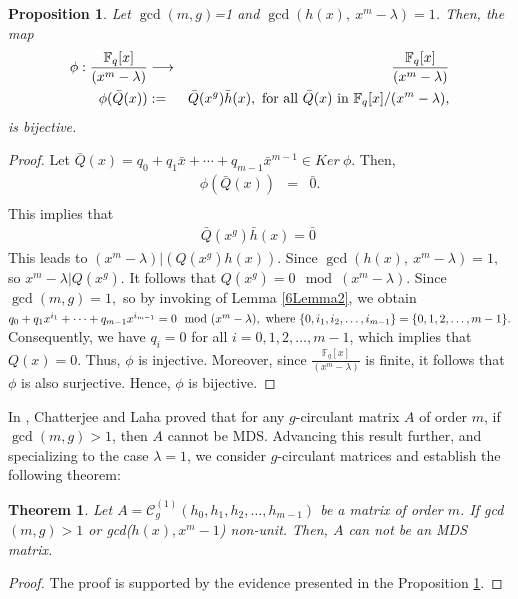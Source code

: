 \documentclass[12pt]{article}
\newtheorem{theorem}{Theorem}
\newtheorem{proposition}{Proposition}
\begin{document}
\begin{proposition}\label{6Proposition2}
	Let $\gcd(m,g)$=1 and $\gcd(h(x),~x^m-\lambda)=1$. Then, the map 
	\begin{eqnarray*}
	\phi:\frac{\mathbb{F}_q[x]}{(x^m-\lambda)} &\longrightarrow& \frac{\mathbb{F}_q[x]}{(x^m-\lambda)}\\		\phi(\bar{Q}(x))&:=&\bar{Q}(x^g)\bar{h}(x),\textup{ for all $\bar{Q}(x)$ in \( \mathbb{F}_q[x]/(x^m - \lambda) \),}
\end{eqnarray*}
	is bijective. 
\end{proposition}
\begin{proof}
	Let $\bar{Q}(x)=q_0+q_1\bar{x}+\cdots+q_{m-1}\bar{x}^{m-1}\in Ker~\phi$. Then, 
	\begin{eqnarray*}
		\phi(\bar{Q}(x))&=&\bar{0}.\\
	\end{eqnarray*}
	This implies that
	\begin{eqnarray*}	
			\bar{Q}(x^g)\bar{h}(x)=\bar{0}~
	\end{eqnarray*}
	This leads to $(x^m-\lambda)|(Q(x^g)h(x)).$ Since $\gcd(h(x),~x^m-\lambda)=1,$ so $x^m-\lambda |Q(x^g).$ It follows that $Q(x^g)=0 \mod(x^m-\lambda)$. Since $\gcd(m,g)=1,$ so by invoking of Lemma \ref{6Lemma2}, we obtain
	$q_0+q_1x^{i_1}+\cdots+q_{m-1}x^{i_{m-1}}=0 \mod (x^m-\lambda), \textup{ where}~\{0,i_1,i_2,\dots,i_{m-1}\}=\{0,1,2,\dots,m-1\}.$
Consequently, we have \( q_i = 0 \) for all \( i = 0,1,2,\dots,m-1 \), which implies that \( Q(x) = 0 \). Thus, \( \phi \) is injective. Moreover, since \( \frac{\mathbb{F}_q[x]}{(x^m-\lambda)} \) is finite, it follows that \( \phi \) is also surjective. Hence, \( \phi \) is bijective.


\end{proof}
In \cite[Theorem 4.1]{Chatterjee2024Anote}, Chatterjee and Laha proved that for any \( g \)-circulant matrix \( A \) of order \( m \), if \( \gcd(m, g) > 1 \), then \( A \) cannot be MDS. Advancing this result further, and specializing to the case \( \lambda = 1 \), we consider \( g \)-circulant matrices and establish the following theorem:

\begin{theorem}
			Let $A=\mathcal{C}_g^{(1)}(h_0, h_1,h_2,\dots, h_{m-1})$ be a matrix of order $m$. If gcd$(m,g)>1$ or gcd($h(x),x^m-1$) non-unit. Then, $A$ can not be an MDS matrix.  
\end{theorem}
\begin{proof}
		The proof is supported by the evidence presented in the Proposition \ref{6Proposition2}.
\end{proof}
\end{document}
